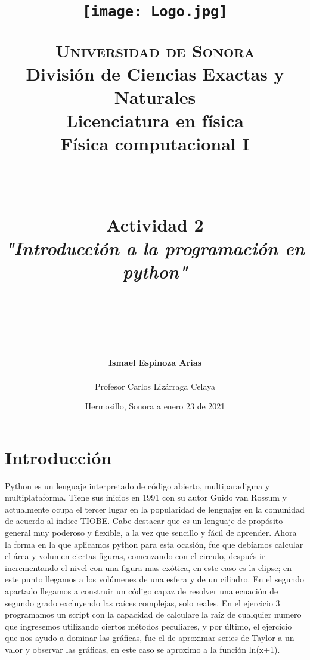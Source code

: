 ﻿\documentclass[12pt]{article}
\newcommand{\HRule}[1]{\rule{\linewidth}{#1}}
\begin{document}
\begin{titlepage}

\title{ \normalsize 
        \begin{center}
        \texttt{[image: Logo.jpg]}
        \end{center}
        \LARGE \textsc{\textbf{Universidad de Sonora}} \\ \bigskip
		\Large División de Ciencias Exactas y Naturales \\
        Licenciatura en física \\ \bigskip
        \bigskip
        Física computacional I
		\\ [0.1cm]  
		\HRule{2pt} \\
		\Large \textbf{{Actividad 2}} \\
        \textit{\textbf{"Introducción a la programación en python"}}
		\HRule{2pt} \\
		\normalsize \vspace*{0.001\baselineskip}}
        
\date{\bigskip \Large  \hspace*{\fill} Hermosillo, Sonora a enero 23 de 2021}

        
\author{
		\Large\textbf{ Ismael Espinoza Arias} \\ \bigskip
        \\ \bigskip
       \Large Profesor Carlos Lizárraga Celaya}
       \end{titlepage}
       \maketitle
       

\newpage
\pagestyle{plain}
\section{Introducción}
 Python es un lenguaje interpretado de código abierto, multiparadigma y multiplataforma. Tiene sus inicios en 1991 con su autor Guido van Rossum y actualmente ocupa el tercer lugar en la popularidad de lenguajes en la comunidad de acuerdo al índice TIOBE. Cabe destacar que es un lenguaje de propósito general muy poderoso y flexible, a la vez que sencillo y fácil de aprender. Ahora la forma en la que aplicamos python para esta ocasión, fue que debíamos calcular el área y volumen ciertas figuras, comenzando con el circulo, después ir incrementando el nivel con una figura mas exótica, en este caso es la elipse; en este punto llegamos a los volúmenes de una esfera y de un cilindro. En el segundo apartado llegamos a construir un código capaz de resolver una ecuación de segundo grado excluyendo las raíces complejas, solo reales. En el ejercicio 3 programamos un script con la capacidad de calculare la raíz de cualquier numero que ingresemos utilizando ciertos métodos peculiares, y por último, el ejercicio que nos ayudo a dominar las gráficas, fue el de aproximar series de Taylor a un valor y observar las gráficas, en este caso se aproximo a la función ln(x+1). 
\end{document}

